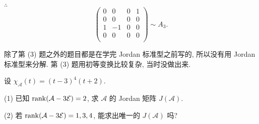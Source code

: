 \documentclass{ctexart}
\begin{document}
\begin{solution}
    $\therefore$
    \[\begin{pmatrix}
        0 & 0 & 0 & 1 \\
        0 & 0 & 0 & 0 \\
        1 & -1 & 0 & 0 \\
        0 & 0 & 0 & 0 \\
    \end{pmatrix}\sim A_3.\]
\end{solution}
\begin{note}
    除了第 (3) 题之外的题目都是在学完 Jordan 标准型之前写的, 所以没有用 Jordan 标准型来分解. 第 (3) 题用初等变换比较复杂, 当时没做出来.
\end{note}
\begin{exercise}%
    设 $\chi_\mathcal{A}(t)=(t-3)^4(t+2)$.

    (1) 已知 $\operatorname{rank} (\mathcal{A}-3\mathcal{E})=2$, 求 $\mathcal{A}$ 的 Jordan 矩阵 $J(\mathcal{A})$.

    (2) 若 $\operatorname{rank} (\mathcal{A}-3\mathcal{E})=1,3,4$, 能求出唯一的 $J(\mathcal{A})$ 吗?
\end{exercise}
\end{document}

